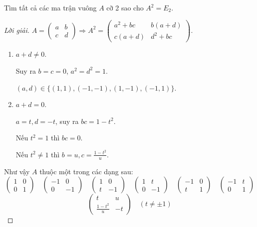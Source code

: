 \documentclass[class=nhvh-linear-algebra,crop=false]{standalone}
\begin{document}
\begin{exercise}
    Tìm tất cả các ma trận vuông $A$ cỡ 2 sao cho $A^{2} = E_{2}$.
\end{exercise}

\begin{proof}[Lời giải]
    $A = \begin{pmatrix}a & b \\ c & d\end{pmatrix}\Rightarrow A^{2} = \begin{pmatrix}a^{2}+bc & b(a+d) \\ c(a+d) & d^{2}+bc\end{pmatrix}$.
    \begin{enumerate}[label = Trường hợp \arabic*:,itemindent=2cm]
        \item $a + d\ne 0$.
              \par Suy ra $b = c = 0$, $a^{2} = d^{2} = 1$.
              \par $(a,d)\in\{  (1,1), (-1,-1), (1,-1), (-1,1) \}$.
        \item $a + d = 0$.
              \par $a = t, d = -t$, suy ra $bc = 1 - t^{2}$.
              \par Nếu $t^{2} = 1$ thì $bc = 0$.
              \par Nếu $t^{2} \ne 1$ thì $b = u, c = \frac{1-t^{2}}{u}$.
    \end{enumerate}
    \par Như vậy $A$ thuộc một trong các dạng sau:
    \[
        \begin{pmatrix}
            1 & 0 \\
            0 & 1
        \end{pmatrix}
        \quad
        \begin{pmatrix}
            -1 & 0  \\
            0  & -1
        \end{pmatrix}
        \quad
        \begin{pmatrix}
            1 & 0  \\
            t & -1
        \end{pmatrix}
        \quad
        \begin{pmatrix}
            1 & t  \\
            0 & -1
        \end{pmatrix}
        \quad
        \begin{pmatrix}
            -1 & 0 \\
            t  & 1
        \end{pmatrix}
        \quad
        \begin{pmatrix}
            -1 & t \\
            0  & 1
        \end{pmatrix}
    \]
    \[
        \begin{pmatrix}
            t                 & u  \\
            \frac{1-t^{2}}{u} & -t
        \end{pmatrix} \quad (t\ne\pm{1})
    \]
\end{proof}
\end{document}
